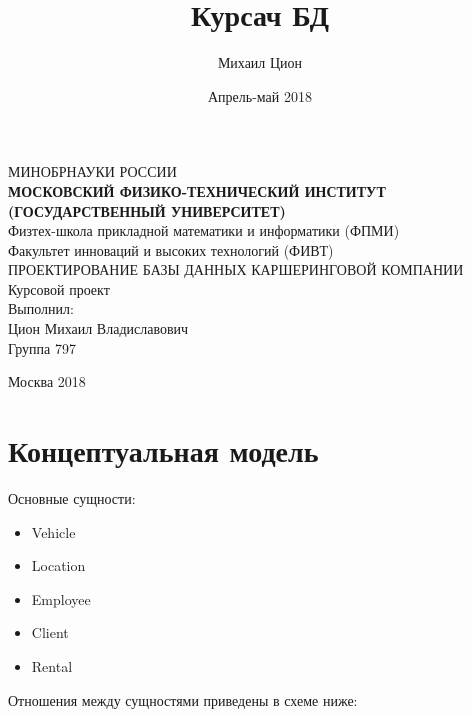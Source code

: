 \documentclass{article}
\author{Михаил Цион}
\date{Апрель-май 2018}
\title{Курсач БД}
\begin{document}
\begin{center}
    \hfill \break
    \large{МИНОБРНАУКИ РОССИИ}\\
    \small{\textbf{МОСКОВСКИЙ ФИЗИКО-ТЕХНИЧЕСКИЙ ИНСТИТУТ \\(ГОСУДАРСТВЕННЫЙ УНИВЕРСИТЕТ)}}\\
    \hfill \break
    \normalsize{Физтех-школа прикладной математики и информатики (ФПМИ)}\\
    \normalsize{Факультет инноваций и высоких технологий (ФИВТ)}\\
    \hfill \break
    \hfill \break
    \hfill \break
    \hfill \break
    \large{ПРОЕКТИРОВАНИЕ БАЗЫ ДАННЫХ КАРШЕРИНГОВОЙ КОМПАНИИ}\\
    \hfill \break
    \hfill \break
    \hfill \break
    \hfill \break
    \hfill \break
    \normalsize{Курсовой проект}\\
    \hfill \break
    \hfill \break
    \normalsize{Выполнил:}\\
    \normalsize{Цион Михаил Владиславович}\\
    \normalsize{Группа 797}\\
    \hfill \break
    \hfill \break
\end{center}
\vfill
\begin{center} Москва 2018 \end{center}


\thispagestyle{empty}
\newpage

\section{Концептуальная модель}

Основные сущности:

\begin{itemize}
    \item
        Vehicle
            
    \item
        Location
            
    \item
        Employee 
            
    \item
        Client
        
    \item
        Rental
        
\end{itemize}

Отношения между сущностями приведены в схеме ниже:
\end{document}
